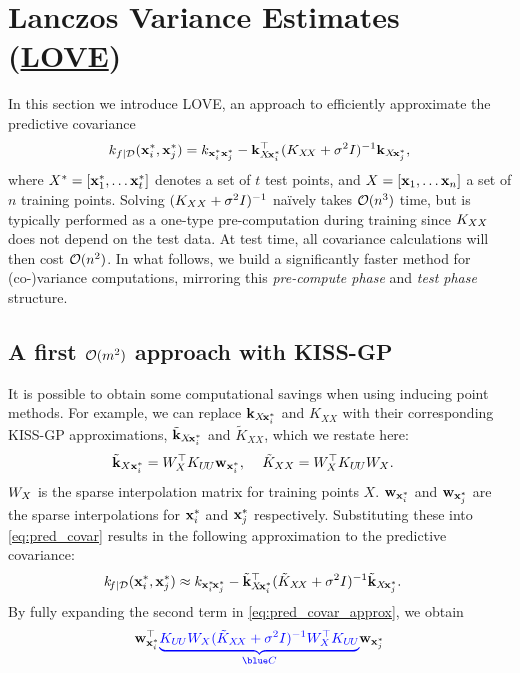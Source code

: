 \section{Lanczos Variance Estimates (\href{https://www.youtube.com/watch?v=t5ze_e4R9QY}{LOVE{}})}
\label{sec:method}

In this section we introduce LOVE{}, an approach to efficiently approximate the predictive covariance
\begin{align*}
  k_{f\mid\mathcal D}(\mathbf{x}^*_i, \mathbf{x}^*_j) = k_{\mathbf{x}^{*}_i \mathbf{x}^{*}_j} - \mathbf{k}_{X \! \mathbf{x}^{*}_i}^\top (K_{X\!X} + \sigma^2 I)^{-1} \mathbf{k}_{X \! \mathbf{x}^{*}_j},
\end{align*}
where $X^{*} = [ \mathbf{x}^{*}_1, \ldots \mathbf{x}^{*}_t ]$ denotes a set of $t$ test points, and $X = [\mathbf{x}_1, \ldots \mathbf{x}_n]$ a set of $n$ training points.
%
Solving $(K_{X X} + \sigma^2 I)^{-1}$ na\"ively takes $\bigo{n^3}$ time, but is typically performed as a one-type pre-computation during training since $K_{X X}$ does not depend on the test data.
At test time, all covariance calculations will then cost $\bigo{n^2}$.
In what follows, we build a significantly faster method for (co-)variance computations, mirroring this \emph{pre-compute phase} and \emph{test phase} structure.

\subsection{A first $\bigo{m^2}$ approach with KISS-GP}
It is possible to obtain some computational savings when using inducing point methods.
For example, we can replace $\mathbf{k}_{X \! \mathbf{x}^*_i}$ and $K_{X \! X}$ with their corresponding KISS-GP approximations,
$\tilde{\mathbf{k}}_{X \! \mathbf{x}^*_i}$ and $\tilde{K}_{X \! X}$, which we restate here:
%
%
\begin{align*}
  \tilde{\mathbf{k}}_{X \mathbf{x}^*_i} = W^\top_{X} K_{U \! U} \mathbf{w}_{\mathbf{x}^*_i},
  \: \: \: & \: \: \:
  \tilde{K}_{X X} = W^\top_{X} K_{U \! U} W_{X}.
\end{align*}
$W_{X}$ is the sparse interpolation matrix for training points $X$.
$\mathbf{w}_{\mathbf{x}^{*}_i}$ and $\mathbf{w}_{\mathbf{x}^{*}_j}$ are the sparse interpolations for $\mathbf{x}^{*}_i$ and $\mathbf{x}^{*}_j$ respectively.
Substituting these into \eqref{eq:pred_covar} results in the following approximation to the predictive covariance:
%
\begin{align}
  k_{\!f\mid\mathcal D}(\mathbf{x}^*_i, \mathbf{x}^*_j) &\approx k_{\mathbf{x}^{*}_i \! \mathbf{x}^{*}_j} - \tilde{\mathbf{k}}_{X \! \mathbf{x}^{*}_i}^\top (\tilde{K}_{X\!X} + \sigma^2 I)^{-1} \tilde{\mathbf{k}}_{X \! \mathbf{x}^{*}_j}.
    \label{eq:pred_covar_approx}
\end{align}
%
By fully expanding the second term in \eqref{eq:pred_covar_approx}, we obtain
%
\begin{equation}
  \bw_{\bx^*_i}^{\top} {\color{blue}\underbrace{{\bK_{U \! U} W_{\bX} (\tilde{K}_{\bX\!\bX} + \sigma^2 \bI)^{-1} W^\top_{\bX} \bK_{U \! U}}}_{\blue C}} \bw_{\bx^*_j}
  \label{eq:pred_covar_ski_cache}
\end{equation}
%


